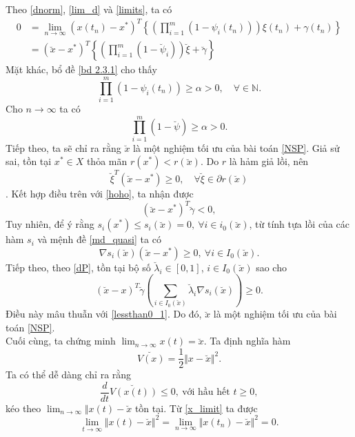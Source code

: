 \begin{cm}
\begin{equation}
    \end{equation}
    Theo \eqref{dnorm}, \eqref{lim_d} và \eqref{limits}, ta có
    \begin{equation}
        \label{hoho}
        \begin{aligned}
            0 &= \lim_{n \to \infty}(x(t_n) - x^*)^T 
            \left\{ \left(\prod_{i=1}^m (1 - \psi_i(t_n)) \right) \xi(t_n) + \gamma(t_n) \right\} \\
            &= (\breve{x} - x^*)^T \left\{\left( \prod_{i=1}^m (1 - \breve{\psi}_i)  \right) \breve{\xi} + \breve{\gamma}  \right\}
        \end{aligned}
    \end{equation}
    Mặt khác, bổ đề \ref{bd 2.3.1} cho thấy
    \begin{equation}
        \prod_{i=1}^m (1 - \psi_i(t_n)) \geq \alpha > 0, \quad \forall  \in \mathbb{N}.
    \end{equation}
    Cho $n \rightarrow \infty$ ta có
    \begin{equation*}
        \prod_{i=1}^m (1 - \breve{\psi}) \geq \alpha > 0.
    \end{equation*}
    Tiếp theo, ta sẽ chỉ ra rằng $\breve{x}$ là một nghiệm tối ưu của bài toán \eqref{NSP}. Giả sử sai, tồn tại $x^* \in X$ thỏa mãn $r(x^*) < r(\breve{x})$. Do $r$ là hảm giả lồi, nên
    $$ \breve{\xi}^T (\breve{x} - x^*) \geq 0, \quad \forall \breve{\xi} \in \partial r(\breve{x})$$.
    Kết hợp điều trên với \eqref{hoho}, ta nhận được
    \begin{equation}
        \label{lessthan0_1}
        (\breve{x} - x^*)^T\breve{\gamma} < 0,
    \end{equation}
    Tuy nhiên, để ý rằng $s_i(x^*) \leq s_i(\breve{x}) = 0,\ \forall i \in i_0(\breve{x})$, từ tính tựa lồi của các hàm $s_i$ và mệnh đề \ref{md_quasi} ta có
    $$ \nabla s_i(\breve{x})(\breve{x} - x^*) \geq 0,\ \forall i \in I_0(\breve{x}).$$
    Tiếp theo, theo \eqref{dP}, tồn tại bộ số $\breve{\lambda}_i \in [0,1]$, $i \in I_0(\breve{x})$ sao cho
    $$ (\breve{x} - x)^T \breve{\gamma} \left(\sum_{i \in I_0(\breve{x})} \breve{\lambda}_i\nabla s_i(\breve{x}) \right) \geq 0.$$
    Điều này mâu thuẫn với \eqref{lessthan0_1}. Do đó, $\breve{x}$ là một nghiệm tối ưu của bài toán \eqref{NSP}.\\
    \indent Cuối cùng, ta chứng minh $\lim_{n \to \infty} x(t) = \breve{x}$. Ta định nghĩa hàm 
    $$\breve{V(x)} = \dfrac{1}{2} \Vert x - \breve{x} \Vert^2.$$  
    Ta có thể dễ dàng chỉ ra rằng 
    \begin{equation*}
        \dfrac{d}{dt} \breve{V(x(t))} \leq 0,\ \text{với hầu hết } t \geq 0,
    \end{equation*}
    kéo theo $\lim_{n \to \infty} \Vert x(t) - \breve{x}$ tồn tại. Từ \eqref{x_limit} ta được
    \begin{equation*}
        \lim_{t \to \infty} \Vert x(t) - \breve{x} \Vert^2 = \lim_{n \to \infty} \Vert x(t_n) - \breve{x} \Vert^2 = 0.
    \end{equation*}
\end{cm}



